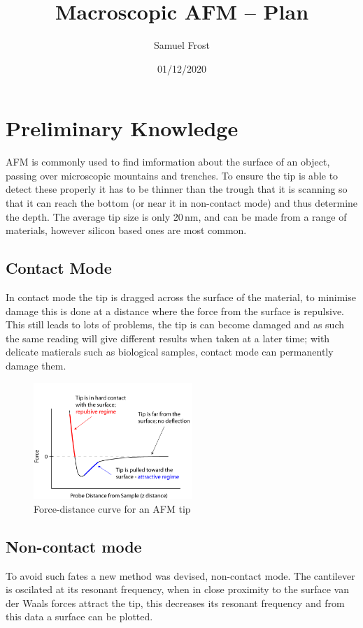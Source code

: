 \documentclass{article}
\title{Macroscopic AFM -- Plan}
\date{01/12/2020}
\author{Samuel Frost}
\begin{document}
\maketitle

\section*{Preliminary Knowledge}
AFM is commonly used to find imformation about the surface of an object, passing over microscopic mountains and 
trenches. To ensure the tip is able to detect these properly it has to be thinner than the trough that it is scanning
so that it can reach the bottom (or near it in non-contact mode) and thus determine the depth. The average tip 
size is only 20\,nm, and can be made from a range of materials, however silicon based ones are most common. 

\subsection*{Contact Mode}
In contact mode the tip is dragged across the surface of the material, to minimise damage this is done at a distance 
where the force from the surface is repulsive. This still leads to lots of problems, the tip is can become damaged and 
as such the same reading will give different results when taken at a later time; with delicate matierals such
as biological samples, contact mode can permanently damage them. 

\begin{figure}[h]
    \centering
    \captionsetup{justification=centering}
    \includegraphics[width=6cm]{AFM.png}
    \caption{Force-distance curve for an AFM tip\cite{curve}}
\end{figure}

\subsection*{Non-contact mode}
To avoid such fates a new method was devised, non-contact mode. The cantilever is oscilated at its resonant 
frequency, when in close proximity to the surface van der Waals forces attract the tip, this decreases its resonant
frequency and from this data a surface can be plotted. 
\end{document}
